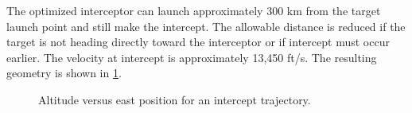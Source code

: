 The optimized interceptor can launch approximately 300 km from the target launch
point and still make the intercept.  The allowable distance is reduced if the target is
not heading directly toward the interceptor or if intercept must occur earlier.  The
velocity at intercept is approximately 13,450 ft/s.  The resulting geometry is shown
in \cref{fig:example-air-intercept}.

\begin{figure}[htbp]
  \centering
  \resizebox{0.84\linewidth}{!}{}
  \caption{Altitude versus east position for an intercept trajectory.}
  \label{fig:example-air-intercept}
\end{figure}
